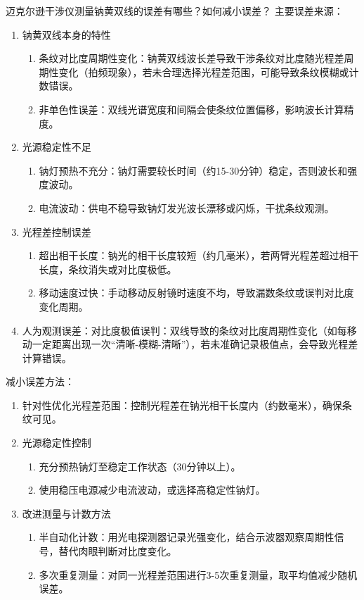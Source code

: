 \documentclass[dvipsnames, svgnames,a4paper,11pt]{article}
\begin{document}
\begin{question}
	迈克尔逊干涉仪测量钠黄双线的误差有哪些？如何减小误差？
	\tcblower
	主要误差来源：
	\begin{enumerate}
		\item 钠黄双线本身的特性\begin{enumerate}
			\item 条纹对比度周期性变化：钠黄双线波长差导致干涉条纹对比度随光程差周期性变化（拍频现象），若未合理选择光程差范围，可能导致条纹模糊或计数错误。
			\item 非单色性误差：双线光谱宽度和间隔会使条纹位置偏移，影响波长计算精度。
		\end{enumerate}
		\item 光源稳定性不足\begin{enumerate}
			\item 钠灯预热不充分：钠灯需要较长时间（约15-30分钟）稳定，否则波长和强度波动。
			\item 电流波动：供电不稳导致钠灯发光波长漂移或闪烁，干扰条纹观测。
		\end{enumerate}
		\item 光程差控制误差\begin{enumerate}
			\item 超出相干长度：钠光的相干长度较短（约几毫米），若两臂光程差超过相干长度，条纹消失或对比度极低。
			\item 移动速度过快：手动移动反射镜时速度不均，导致漏数条纹或误判对比度变化周期。
		\end{enumerate}
		\item 人为观测误差：对比度极值误判：双线导致的条纹对比度周期性变化（如每移动一定距离出现一次“清晰-模糊-清晰”），若未准确记录极值点，会导致光程差计算错误。
	\end{enumerate}
	减小误差方法：
	\begin{enumerate}
		\item 针对性优化光程差范围：控制光程差在钠光相干长度内（约数毫米），确保条纹可见。
		\item 光源稳定性控制\begin{enumerate}
			\item 充分预热钠灯至稳定工作状态（30分钟以上）。
			\item 使用稳压电源减少电流波动，或选择高稳定性钠灯。
		\end{enumerate}
		\item 改进测量与计数方法\begin{enumerate}
			\item 半自动化计数：用光电探测器记录光强变化，结合示波器观察周期性信号，替代肉眼判断对比度变化。
			\item 多次重复测量：对同一光程差范围进行3-5次重复测量，取平均值减少随机误差。
		\end{enumerate}
	\end{enumerate}
\end{question}
\end{document}

